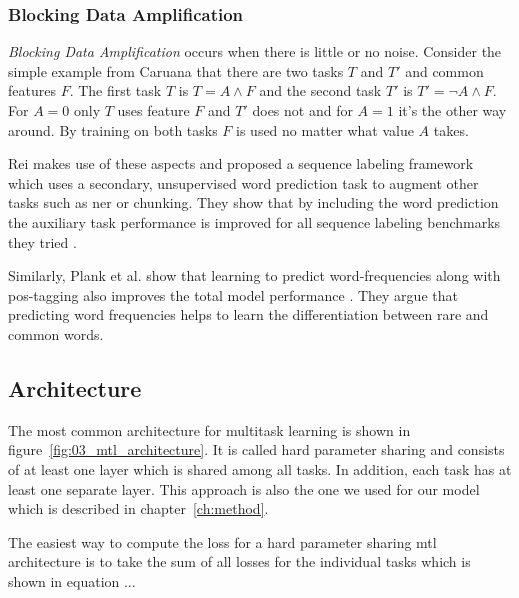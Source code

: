 \subsubsection*{Blocking Data Amplification}

\textit{Blocking Data Amplification} occurs when there is little or no noise. Consider the simple example from Caruana \cite{Caruana1995a} that there are two tasks $T$ and $T'$ and common features $F$. The first task $T$ is $T = A \land F $ and the second task $T'$ is $T' = \neg A \land F$. For $A=0$ only $T$ uses feature $F$ and $T'$ does not and for $A=1$ it's the other way around. By training on both tasks $F$ is used no matter what value $A$ takes. 

Rei makes use of these aspects and proposed a sequence labeling framework which uses a secondary, unsupervised word prediction task to augment other tasks such as \gls{ner} or chunking. They show that by including the word prediction the auxiliary task performance is improved for all sequence labeling benchmarks they tried \cite{Rei2017}.

Similarly, Plank et al. show that learning to predict word-frequencies along with \gls{pos}-tagging also improves the total model performance \cite{Plank}. They argue that predicting word frequencies helps to learn the differentiation between rare and common words.


\subsection{Architecture}
The most common architecture for multitask learning is shown in figure~\ref{fig:03_mtl_architecture}. It is called hard parameter sharing and consists of at least one layer which is shared among all tasks. In addition, each task has at least one separate layer. This approach is also the one we used for our model which is described in chapter~\ref{ch:method}. 

The easiest way to compute the loss for a hard parameter sharing \gls{mtl} architecture is to take the sum of all losses for the individual tasks which is shown in equation ...



